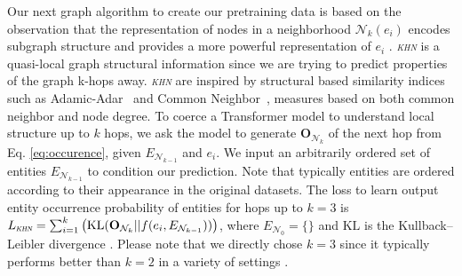\documentclass{article}
\newcommand{\hn}{\textsl{\textsc{khn}}\xspace}
\begin{document}
Our next graph algorithm to create our pretraining data is based on the observation that the representation of nodes in a neighborhood $\mathcal{N}_k(e_i)$ encodes subgraph structure and provides a more powerful representation of $e_i$ \cite{grl_hamilton_2017}. 
\hn is a quasi-local graph structural information since we are trying to predict properties of the graph k-hops away. 
\hn are inspired by structural based similarity indices such as Adamic-Adar~\cite{ADAMIC2003211} and Common Neighbor~\cite{PhysRevE.64.025102}, measures based on both common neighbor and node degree.
To coerce a Transformer model to understand local structure up to $k$ hops, we ask the model to generate $\mathbf{O}_{\mathcal{N}_k}$ of the next hop from Eq. \ref{eq:occurence}, given $E_{\mathcal{N}_{k-1}}$ and $e_i$.
We input an arbitrarily ordered set of entities $E_{\mathcal{N}_{k-1}}$ to condition our prediction.
Note that typically entities are ordered according to their appearance in the original datasets.
The loss to learn output entity occurrence probability of entities for hops up to $k=3$ is $L_{\hn} = \sum^k_{i=1}\big ( \text{KL}(\mathbf{O}_{\mathcal{N}_k}||f(e_i,E_{\mathcal{N}_{k-1}})) \big )$, where $E_{\mathcal{N}_{0}} = \{\}$ and $\text{KL}$ is the Kullback–Leibler divergence \cite{d_kl}.
Please note that we directly chose $k=3$ since it typically performs better than $k=2$ in a variety of settings \cite{nikolentzos2020k}.
\end{document}
